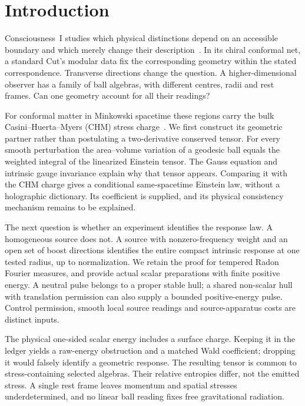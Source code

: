 \documentclass[12pt]{article}
\theoremstyle{definition}
\theoremstyle{remark}
\begin{document}
\clearpage
\tableofcontents
\clearpage

\section{Introduction}\label{sec:intro}

Consciousness~I studies which physical distinctions depend on an accessible
boundary and which merely change their description~\cite{PaperI}. In its
chiral conformal net, a standard Cut's modular data fix the corresponding
geometry within the stated correspondence.
Transverse directions change the question. A higher-dimensional observer
has a family of ball algebras, with different centres, radii and rest
frames. Can one geometry account for all their readings?

For conformal matter in Minkowski spacetime these regions carry the
bulk Casini--Huerta--Myers (CHM) stress charge~\cite{CasiniHuertaMyers2011}.
We first construct its geometric partner rather than postulating a
two-derivative conserved tensor. For every smooth perturbation the
area--volume variation of a geodesic ball equals the weighted integral
of the linearized Einstein tensor. The Gauss equation and intrinsic
gauge invariance explain why that tensor appears. Comparing it with the
CHM charge gives a conditional same-spacetime Einstein law, without a
holographic dictionary. Its coefficient is supplied, and its physical
consistency mechanism remains to be explained.

The next question is whether an experiment identifies the response law.
A homogeneous source does not. A source with nonzero-frequency weight
and an open set of boost directions identifies the entire compact
intrinsic response at one tested radius, up to normalization. We retain
the proof for tempered Radon Fourier measures, and provide actual scalar
preparations with finite positive energy. A neutral pulse belongs to a
proper stable hull; a shared non-scalar hull with translation permission
can also supply a bounded positive-energy pulse. Control permission,
smooth local source readings and source-apparatus costs are distinct inputs.

The physical one-sided scalar energy includes a surface charge. Keeping
it in the ledger yields a raw-energy obstruction and a matched Wald
coefficient; dropping it would falsely identify a geometric response.
The resulting tensor is common to stress-containing selected algebras.
Their relative entropies differ, not the emitted stress. A single rest
frame leaves momentum and spatial stresses underdetermined, and no
linear ball reading fixes free gravitational radiation.
\end{document}

